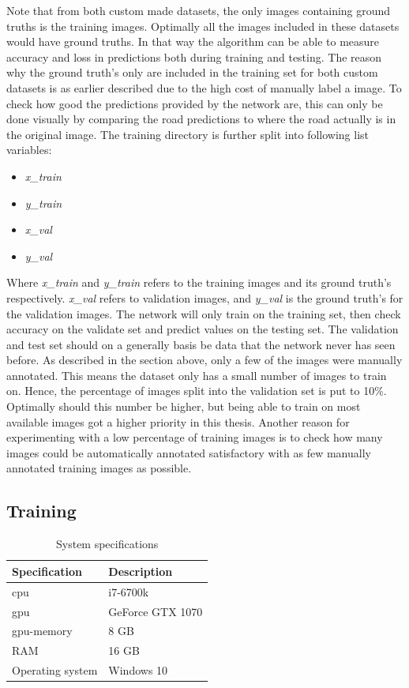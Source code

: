 \documentclass[USenglish]{ifimaster}  %
\begin{document}
Note that from both custom made datasets, the only images containing ground truths is the training images. Optimally all the images included in these datasets would have ground truths. In that way the algorithm can be able to measure accuracy and loss in predictions both during training and testing. The reason why the ground truth's only are included in the training set for both custom datasets is as earlier described due to the high cost of manually label a image. To check how good the predictions provided by the network are, this can only be done visually by comparing the road predictions to where the road actually is in the original image.
\newline
\newline
The training directory is further split into following list variables:
\begin{itemize}
    \item \textit{x\_train}
    \item \textit{y\_train}
    \item \textit{x\_val}
    \item \textit{y\_val}
\end{itemize}
Where \textit{x\_train} and \textit{y\_train} refers to the training images and its ground truth's respectively. \textit{x\_val} refers to validation images, and \textit{y\_val} is the ground truth's for the validation images. The network will only train on the training set, then check accuracy on the validate set and predict values on the testing set. The validation and test set should on a generally basis be data that the network never has seen before. As described in the section above, only a few of the images were manually annotated. This means the dataset only has a small number of images to train on. Hence, the percentage of images split into the validation set is put to 10\%. Optimally should this number be higher, but being able to train on most available images got a higher priority in this thesis. Another reason for experimenting with a low percentage of training images is to check how many images could be automatically annotated satisfactory with as few manually annotated training images as possible.

\subsection{Training}

\begin{table}[ht]
\centering
\begin{tabular}{ll}
\hline
\textbf{Specification} & \textbf{Description} \\ \hline
\ac{cpu} & i7-6700k \\
\ac{gpu} & GeForce GTX 1070  \\
\ac{gpu}-memory & 8 GB  \\
RAM & 16 GB \\
Operating system & Windows 10  \\ \hline
\end{tabular}
\caption{System specifications}
\label{table:system_spec}
\end{table}
\end{document}
